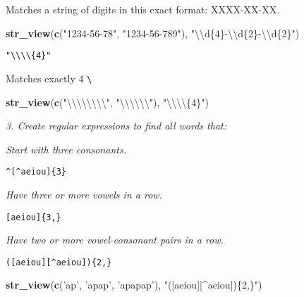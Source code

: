 \documentclass[]{article}
\newenvironment{Shaded}{\begin{snugshade}}{\end{snugshade}}
\newcommand{\KeywordTok}[1]{\textcolor[rgb]{0.13,0.29,0.53}{\textbf{#1}}}
\newcommand{\CharTok}[1]{\textcolor[rgb]{0.31,0.60,0.02}{#1}}
\newcommand{\StringTok}[1]{\textcolor[rgb]{0.31,0.60,0.02}{#1}}
\newcommand{\NormalTok}[1]{#1}
\theoremstyle{definition}
\theoremstyle{definition}
\theoremstyle{definition}
\theoremstyle{remark}
\begin{document}
Matches a string of digits in this exact format: XXXX-XX-XX.

\begin{Shaded}
\begin{Highlighting}[]
\KeywordTok{str_view}\NormalTok{(}\KeywordTok{c}\NormalTok{(}\StringTok{"1234-56-78"}\NormalTok{, }\StringTok{"1234-56-789"}\NormalTok{), }\StringTok{"}\CharTok{\textbackslash{}\textbackslash{}}\StringTok{d\{4\}-}\CharTok{\textbackslash{}\textbackslash{}}\StringTok{d\{2\}-}\CharTok{\textbackslash{}\textbackslash{}}\StringTok{d\{2\}"}\NormalTok{)}
\end{Highlighting}
\end{Shaded}

\hypertarget{htmlwidget-3b2b9f5e212442ea7ce6}{}

\texttt{"\textbackslash{}\textbackslash{}\textbackslash{}\textbackslash{}\{4\}"}

Matches exactly 4 \texttt{\textbackslash{}}

\begin{Shaded}
\begin{Highlighting}[]
\KeywordTok{str_view}\NormalTok{(}\KeywordTok{c}\NormalTok{(}\StringTok{"}\CharTok{\textbackslash{}\textbackslash{}\textbackslash{}\textbackslash{}\textbackslash{}\textbackslash{}\textbackslash{}\textbackslash{}}\StringTok{"}\NormalTok{, }\StringTok{"}\CharTok{\textbackslash{}\textbackslash{}\textbackslash{}\textbackslash{}\textbackslash{}\textbackslash{}}\StringTok{"}\NormalTok{), }\StringTok{"}\CharTok{\textbackslash{}\textbackslash{}\textbackslash{}\textbackslash{}}\StringTok{\{4\}"}\NormalTok{)}
\end{Highlighting}
\end{Shaded}

\hypertarget{htmlwidget-5df1dc572a68772d0a56}{}

\emph{3. Create regular expressions to find all words that:}

\emph{Start with three consonants.}

\texttt{\^{}{[}\^{}aeiou{]}\{3\}}

\emph{Have three or more vowels in a row.}

\texttt{{[}aeiou{]}\{3,\}}

\emph{Have two or more vowel-consonant pairs in a row.}

\texttt{({[}aeiou{]}{[}\^{}aeiou{]})\{2,\}}

\begin{Shaded}
\begin{Highlighting}[]
\KeywordTok{str_view}\NormalTok{(}\KeywordTok{c}\NormalTok{(}\StringTok{'ap'}\NormalTok{, }\StringTok{'apap'}\NormalTok{, }\StringTok{'apapap'}\NormalTok{), }\StringTok{"([aeiou][^aeiou])\{2,\}"}\NormalTok{)}
\end{Highlighting}
\end{Shaded}
\end{document}
